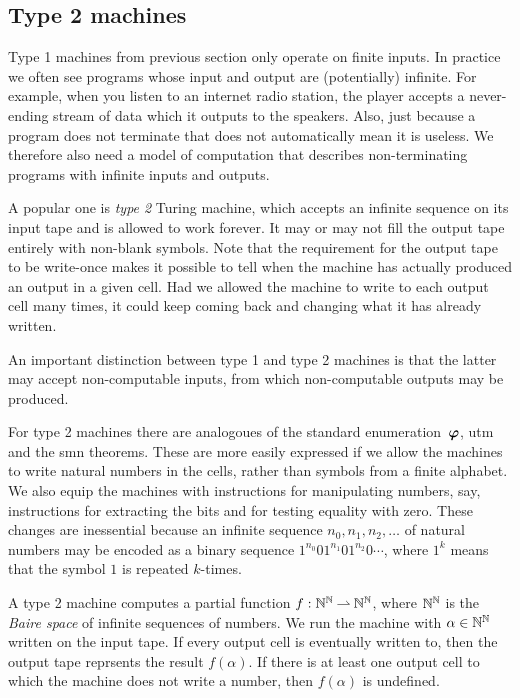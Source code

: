 \subsection{Type 2 machines}
\label{sec:type-2}

Type 1 machines from previous section only operate on finite inputs.
In practice we often see programs whose input and output are
(potentially) infinite. For example, when you listen to an internet
radio station, the player accepts a never-ending stream of data which
it outputs to the speakers. Also, just because a program does not
terminate that does not automatically mean it is useless. We therefore
also need a model of computation that describes non-terminating
programs with infinite inputs and outputs.

A popular one is \emph{type 2} Turing machine, which accepts an
infinite sequence on its input tape and is allowed to work forever. It
may or may not fill the output tape entirely with non-blank symbols.
Note that the requirement for the output tape to be write-once makes
it possible to tell when the machine has actually produced an output
in a given cell. Had we allowed the machine to write to each output
cell many times, it could keep coming back and changing what it has
already written.

An important distinction between type 1 and type 2 machines is that
the latter may accept non-computable inputs, from which non-computable
outputs may be produced.

For type 2 machines there are analogoues of the standard
enumeration~$\text{\boldmath{$\varphi$}}$, utm and the smn theorems. These are more easily
expressed if we allow the machines to write natural numbers in the
cells, rather than symbols from a finite alphabet. We also equip the
machines with instructions for manipulating numbers, say, instructions
for extracting the bits and for testing equality with zero. These
changes are inessential because an infinite sequence $n_0, n_1, n_2,
\ldots$ of natural numbers may be encoded as a binary sequence
$1^{n_0}01^{n_1}01^{n_2}0\cdots$, where $1^k$ means that the symbol
$1$ is repeated $k$-times.

A type 2 machine computes a partial function $f : \mathbb{N}^{\mathbb{N}} \mathbin{\rightharpoonup}
\mathbb{N}^{\mathbb{N}}$, where $\mathbb{N}^{\mathbb{N}}$ is the \emph{Baire space} of infinite
sequences of numbers. We run the machine with $\alpha \in \mathbb{N}^{\mathbb{N}}$
written on the input tape. If every output cell is eventually written
to, then the output tape reprsents the result $f(\alpha)$. If there is
at least one output cell to which the machine does not write a number,
then $f(\alpha)$ is undefined.

